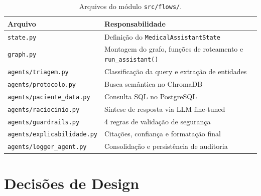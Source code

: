 \begin{table}[H]
\centering
\caption{Arquivos do módulo \texttt{src/flows/}.}
\label{tab:arquivos_flows}
\small
\begin{tabularx}{\textwidth}{l X}
\toprule
\textbf{Arquivo} & \textbf{Responsabilidade} \\
\midrule
\texttt{state.py} & Definição do \texttt{MedicalAssistantState} \\
\texttt{graph.py} & Montagem do grafo, funções de roteamento e \texttt{run\_assistant()} \\
\texttt{agents/triagem.py} & Classificação da query e extração de entidades \\
\texttt{agents/protocolo.py} & Busca semântica no ChromaDB \\
\texttt{agents/paciente\_data.py} & Consulta SQL no PostgreSQL \\
\texttt{agents/raciocinio.py} & Síntese de resposta via LLM fine-tuned \\
\texttt{agents/guardrails.py} & 4 regras de validação de segurança \\
\texttt{agents/explicabilidade.py} & Citações, confiança e formatação final \\
\texttt{agents/logger\_agent.py} & Consolidação e persistência de auditoria \\
\bottomrule
\end{tabularx}
\end{table}

\section{Decisões de Design}


